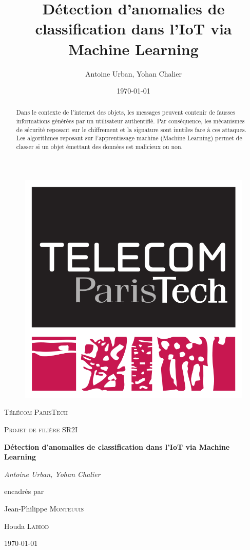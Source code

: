 \documentclass[a4paper]{report}
\title{Détection d'anomalies de classification dans l'IoT via Machine Learning}
\author{Antoine Urban, Yohan Chalier}
\date{\today}
\begin{document}
\begin{titlepage}
	\centering
	\vspace{1cm}
	\begin{figure}
	\centering
	\includegraphics[scale=0.2]{img/logo_TPT.png}
\end{figure}
	\vspace{1cm}
	{\scshape\LARGE Télécom ParisTech \par}
	\vspace{1cm}
	{\scshape\Large Projet de filière SR2I \par}
	\vspace{1.5cm}
	{\huge\bfseries Détection d'anomalies de classification dans l'IoT via Machine Learning\par}
	\vspace{2cm}
	{\Large\itshape Antoine Urban, Yohan Chalier \par}
	\vfill
	encadrés par\par
	Jean-Philippe \textsc{Monteuuis}\par
	Houda \textsc{Labiod}
	\vfill

	{\large \today\par}
\end{titlepage}

\begin{abstract}
Dans le contexte de l'internet des objets, les messages peuvent contenir de fausses informations générées par un utilisateur authentifié. Par conséquence, les mécanismes de sécurité reposant sur le chiffrement et la signature sont inutiles face à ces attaques. Les algorithmes reposant sur l'apprentissage machine (Machine Learning) permet de classer si un objet  émettant des données est malicieux ou non. 
\end{abstract}
\end{document}
